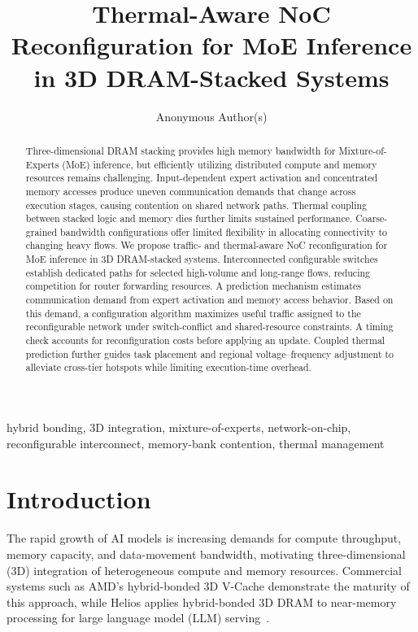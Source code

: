 \documentclass[conference,10pt]{IEEEtran}
\title{Thermal-Aware NoC Reconfiguration for MoE Inference in 3D DRAM-Stacked Systems}
\author{Anonymous Author(s)}
\begin{document}
\maketitle

\begin{abstract}
Three-dimensional DRAM stacking provides high memory bandwidth for Mixture-of-Experts (MoE) inference, but efficiently utilizing distributed compute and memory resources remains challenging. Input-dependent expert activation and concentrated memory accesses produce uneven communication demands that change across execution stages, causing contention on shared network paths. Thermal coupling between stacked logic and memory dies further limits sustained performance. Coarse-grained bandwidth configurations offer limited flexibility in allocating connectivity to changing heavy flows. We propose traffic- and thermal-aware NoC reconfiguration for MoE inference in 3D DRAM-stacked systems. Interconnected configurable switches establish dedicated paths for selected high-volume and long-range flows, reducing competition for router forwarding resources. A prediction mechanism estimates communication demand from expert activation and memory access behavior. Based on this demand, a configuration algorithm maximizes useful traffic assigned to the reconfigurable network under switch-conflict and shared-resource constraints. A timing check accounts for reconfiguration costs before applying an update. Coupled thermal prediction further guides task placement and regional voltage--frequency adjustment to alleviate cross-tier hotspots while limiting execution-time overhead.
\end{abstract}

\begin{IEEEkeywords}
hybrid bonding, 3D integration, mixture-of-experts, network-on-chip,
reconfigurable interconnect, memory-bank contention, thermal management
\end{IEEEkeywords}
\raggedbottom

\section{Introduction}
\label{sec:introduction}

The rapid growth of AI models is increasing demands for compute throughput,
memory capacity, and data-movement bandwidth, motivating three-dimensional (3D)
integration of heterogeneous compute and memory resources. Commercial systems
such as AMD's hybrid-bonded 3D V-Cache demonstrate the maturity of this approach,
while Helios applies hybrid-bonded 3D DRAM to near-memory processing for
large language model (LLM) serving~\cite{wuu2022vcache,li2026helios}.
\end{document}
